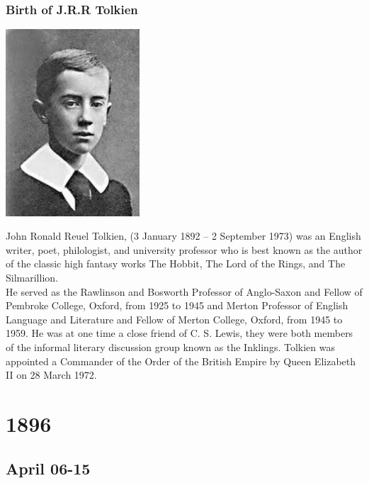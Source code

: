 \documentclass[11pt]{report}
\begin{document}
\subsection{Birth of J.R.R Tolkien}
\vspace{2mm}\begin{center}\includegraphics[width=5cm]{./img/youngTolkien.jpg}\end{center}
John Ronald Reuel Tolkien, (3 January 1892 – 2 September 1973) was an English writer, poet, philologist, and university professor who is best known as the author of the classic high fantasy works The Hobbit, The Lord of the Rings, and The Silmarillion.\\
He served as the Rawlinson and Bosworth Professor of Anglo-Saxon and Fellow of Pembroke College, Oxford, from 1925 to 1945 and Merton Professor of English Language and Literature and Fellow of Merton College, Oxford, from 1945 to 1959. He was at one time a close friend of C. S. Lewis, they were both members of the informal literary discussion group known as the Inklings. Tolkien was appointed a Commander of the Order of the British Empire by Queen Elizabeth II on 28 March 1972.

\chapter{1896}
\section{April 06-15}
\end{document}

